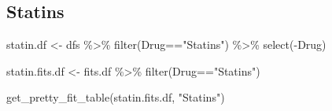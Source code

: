 \documentclass[
]{article}
\newenvironment{Shaded}{\begin{snugshade}}{\end{snugshade}}
\newcommand{\FunctionTok}[1]{\textcolor[rgb]{0.00,0.00,0.00}{#1}}
\newcommand{\NormalTok}[1]{#1}
\newcommand{\OtherTok}[1]{\textcolor[rgb]{0.56,0.35,0.01}{#1}}
\newcommand{\SpecialCharTok}[1]{\textcolor[rgb]{0.00,0.00,0.00}{#1}}
\newcommand{\StringTok}[1]{\textcolor[rgb]{0.31,0.60,0.02}{#1}}
\begin{document}
\hypertarget{statins}{%
\subsection{Statins}\label{statins}}

\begin{Shaded}
\begin{Highlighting}[]
\NormalTok{statin.df }\OtherTok{\textless{}{-}}\NormalTok{ dfs }\SpecialCharTok{\%\textgreater{}\%} 
  \FunctionTok{filter}\NormalTok{(Drug}\SpecialCharTok{==}\StringTok{"Statins"}\NormalTok{) }\SpecialCharTok{\%\textgreater{}\%} 
  \FunctionTok{select}\NormalTok{(}\SpecialCharTok{{-}}\NormalTok{Drug)}
\end{Highlighting}
\end{Shaded}

\begin{Shaded}
\begin{Highlighting}[]
\NormalTok{statin.fits.df }\OtherTok{\textless{}{-}}\NormalTok{ fits.df }\SpecialCharTok{\%\textgreater{}\%} 
  \FunctionTok{filter}\NormalTok{(Drug}\SpecialCharTok{==}\StringTok{"Statins"}\NormalTok{)}
\end{Highlighting}
\end{Shaded}

\begin{Shaded}
\begin{Highlighting}[]
\FunctionTok{get\_pretty\_fit\_table}\NormalTok{(statin.fits.df, }\StringTok{"Statins"}\NormalTok{)}
\end{Highlighting}
\end{Shaded}
\end{document}
